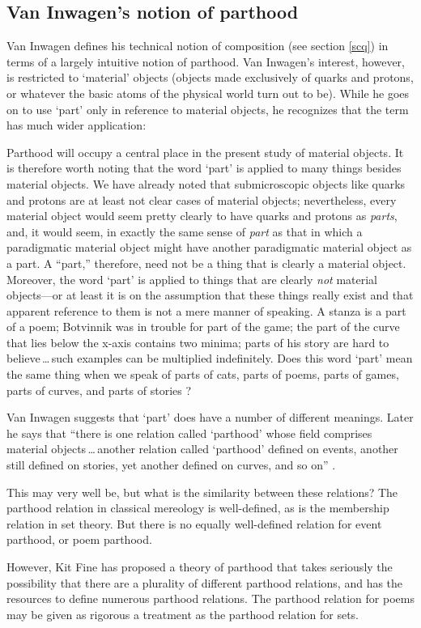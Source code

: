 \documentclass[11pt]{article}
\newenvironment{squote}{%
       \begin{spacing}{1}
       \begin{list}{}{%
       \setlength{\labelwidth}{0pt}%
       \rightmargin\leftmargin%
       }
       \item\relax
       }{%
       \end{list}%
       \end{spacing}
}
\begin{document}
\begin{spacing}{1}
\subsection{Van Inwagen's notion of parthood}
\label{van-part}
Van Inwagen defines his technical notion of composition (see section
\ref{scq}) in terms of a largely intuitive notion of parthood.  Van
Inwagen's interest, however, is restricted to `material' objects
(objects made exclusively of quarks and protons, or whatever the basic
atoms of the physical world turn out to be).  While he goes on to use
`part' only in reference to material objects, he recognizes that the
term has much wider application:

\begin{squote}
Parthood will occupy a central place in the present study of material
objects.  It is therefore worth noting that the word `part' is applied
to many things besides material objects.  We have already noted that
submicroscopic objects like quarks and protons are at least not clear
cases of material objects; nevertheless, every material object would
seem pretty clearly to have quarks and protons as \emph{parts}, and,
it would seem, in exactly the same sense of \emph{part} as that in
which a paradigmatic material object might have another paradigmatic
material object as a part.  A ``part,'' therefore, need not be a thing
that is clearly a material object.  Moreover, the word `part' is
applied to things that are clearly \emph{not} material objects---or at
least it is on the assumption that these things really exist and that
apparent reference to them is not a mere manner of speaking.  A stanza
is a part of a poem; Botvinnik was in trouble for part of the game;
the part of the curve that lies below the x-axis contains two minima;
parts of his story are hard to believe\,\ldots\,such examples can be
multiplied indefinitely.  Does this word `part' mean the same thing
when we speak of parts of cats, parts of poems, parts of games, parts
of curves, and parts of stories \citeyearpar[18--19]{inwagen1995}?
\end{squote} 

Van Inwagen suggests that `part' does have a number of different
meanings.  Later he says that ``there is one relation called
`parthood' whose field comprises material objects\,\ldots\,another
relation called `parthood' defined on events, another still defined on
stories, yet another defined on curves, and so on''
\citeyearpar[19]{inwagen1995}.

This may very well be, but what is the similarity between these
relations?  The parthood relation in classical mereology is
well-defined, as is the membership relation in set theory.  But there
is no equally well-defined relation for event parthood, or poem parthood.

However, Kit Fine has proposed a theory of parthood that takes
seriously the possibility that there are a plurality of different
parthood relations, and has the resources to define numerous parthood
relations.  The parthood relation for poems may be given as rigorous a
treatment as the parthood relation for sets.
\end{spacing}
\end{document}
